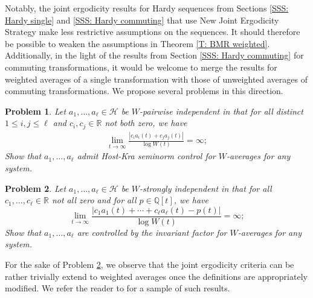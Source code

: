 \documentclass[11pt]{amsart}
\newtheorem{problem}{Problem}
\theoremstyle{definition}
\newcommand{\Q}{{\mathbb Q}}
\newcommand{\R}{{\mathbb R}}
\newcommand{\CH}{{\mathcal H}}
\newcommand{\CX}{{\mathcal X}}
\newcommand{\1}{{\mathbf{1}}}
\begin{document}
        Notably, the joint ergodicity results for Hardy sequences from Sections \ref{SSS: Hardy single} and \ref{SSS: Hardy commuting} that use New Joint Ergodicity Strategy make less restrictive assumptions on the sequences. It should therefore be possible to weaken the assumptions in Theorem \ref{T: BMR weighted}. Additionally, in the light of the results from Section \ref{SSS: Hardy commuting} for commuting transformations, it would be welcome to merge the results for weighted averages of a single transformation with those of unweighted averages of commuting transformations. We propose several problems in this direction.
    \begin{problem}%
        Let $a_1, \ldots, a_\ell\in \CH$ be \emph{$W$-pairwise independent} in that for all distinct $1\leq i, j\leq\ell$ and $c_i, c_j\in\R$ not both zero, we have
        \begin{align*}
            \lim_{t\to\infty}\frac{|c_i a_i(t) + c_j a_j(t)|}{\log W(t)}=\infty;
        \end{align*}
        Show that $a_1, \ldots, a_\ell$ {admit Host-Kra seminorm control for $W$-averages} for any system. 
    \end{problem}
    \begin{problem}%
    \label{Pr: W-strongly independent}
        Let $a_1, \ldots, a_\ell\in \CH$ be \emph{$W$-strongly independent} in that for all $c_1, \ldots, c_\ell\in\R$ not all zero and for all $p\in\Q[t]$, we have
\begin{equation*}%
    \lim_{t\to\infty}\frac{|c_1 a_1(t) + \cdots + c_\ell a_\ell(t) - p(t)|}{\log W(t)} = \infty;
\end{equation*}
        Show that $a_1, \ldots, a_\ell$ are {controlled by the invariant factor for $W$-averages} for any system.
    \end{problem}    
For the sake of Problem \ref{Pr: W-strongly independent}, we observe that the joint ergodicity criteria can be rather trivially extend to weighted averages once the definitions are appropriately modified. We refer the reader to \cite[Section 2.7]{FrKu22a} for a sample of such results.
        
\end{document}
